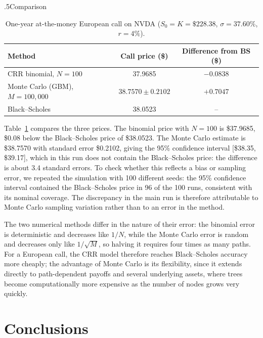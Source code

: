 \documentclass[12pt]{amsart}
\makeatletter
\def\subsection{\@startsection{subsection}{2}{\z@}{.7\linespacing\@plus\linespacing}%
  {.5\linespacing}{\normalfont\bfseries}}
\makeatother
\begin{document}
\subsection{Comparison}\label{sec:comparison}
\begin{table}[H]
\centering
\begin{tabular}{lcc}
\toprule
Method & Call price (\$) & Difference from BS (\$) \\
\midrule
CRR binomial, $N=100$ & 37.9685 & $-0.0838$ \\
Monte Carlo (GBM), $M=100{,}000$ & $38.7570 \pm 0.2102$ & $+0.7047$ \\
Black--Scholes & 38.0523 & -- \\
\bottomrule
\end{tabular}
\caption{One-year at-the-money European call on NVDA ($S_0=K=\$228.38$, $\sigma=37.60\%$, $r=4\%$). \label{tbl:comparison}}
\end{table}

Table~\ref{tbl:comparison} compares the three prices. The binomial price with $N=100$ is
\$37.9685, \$0.08 below the Black--Scholes price of \$38.0523. The Monte Carlo estimate is
\$38.7570 with standard error \$0.2102, giving the 95\% confidence interval [\$38.35, \$39.17],
which in this run does not contain the Black--Scholes price: the difference is about 3.4 standard
errors. To check whether this reflects a bias or sampling error, we repeated the simulation with
100 different seeds: the 95\% confidence interval contained the Black--Scholes price in 96 of
the 100 runs, consistent with its nominal coverage. The discrepancy in the main run is therefore
attributable to Monte Carlo sampling variation rather than to an error in the method.

The two numerical methods differ in the nature of their error: the binomial error is
deterministic and decreases like $1/N$, while the Monte Carlo error is random and decreases only
like $1/\sqrt{M}$, so halving it requires four times as many paths. For a European call, the CRR
model therefore reaches Black--Scholes accuracy more cheaply; the advantage of Monte Carlo is
its flexibility, since it extends directly to path-dependent payoffs and several underlying
assets, where trees become computationally more expensive as the number of nodes grows very
quickly.

\section{Conclusions}
\end{document}

